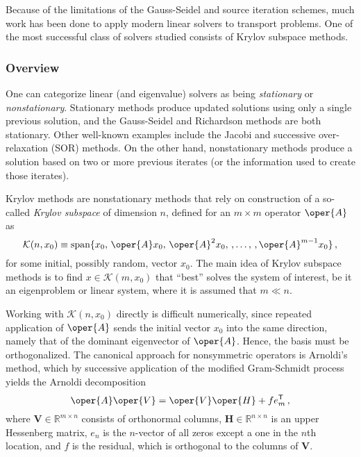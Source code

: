 Because of the limitations of the Gauss-Seidel and source iteration
schemes, much work has been done to apply modern linear solvers to
transport problems.  One of the most successful class of solvers 
studied consists of Krylov subspace methods.  

\subsubsection{Overview}

One can categorize linear (and eigenvalue) solvers as being 
\emph{stationary} or \emph{nonstationary}.  Stationary methods
produce updated solutions using only a single previous solution, and
the Gauss-Seidel and Richardson methods are both stationary.  Other 
well-known examples include the Jacobi and 
successive over-relaxation (SOR) methods.
On the other hand, nonstationary methods produce a solution based on 
two or more previous iterates (or the information used to create those 
iterates). 

Krylov methods are nonstationary methods that rely on 
construction of a so-called \emph{Krylov subspace} of dimension $n$, 
defined for an $m \times m$ operator $\oper{A}$ as
\begin{equation}
 \mathcal{K}(n,x_0) \equiv \text{span} 
     \{x_0,\, \oper{A}x_0,\, \oper{A}^2x_0,\, 
         ,\ldots,\,, \oper{A}^{m-1}x_0 \} \, , 
 \label{eq:krylovsubspace}
\end{equation}
for some initial, possibly random, vector $x_0$.  The main idea of Krylov
subspace methods is to find  $x \in \mathcal{K}(m,x_0)$  
 that ``best'' solves the system of interest, be it an 
eigenproblem or linear system, where it is assumed that $m \ll n$.

Working with $\mathcal{K}(n, x_0)$ directly is difficult numerically, since
repeated application of $\oper{A}$ sends the initial vector $x_0$ into the
same direction, namely that of the dominant eigenvector of $\oper{A}$.  
Hence, the basis 
must be orthogonalized. The canonical approach for nonsymmetric 
operators is Arnoldi's method, which by successive application of the 
modified Gram-Schmidt process yields the Arnoldi decomposition
\begin{equation}
 \oper{A}\oper{V} = \oper{V} \oper{H} + fe^{\transp}_m \, ,
\end{equation}
where $\mathbf{V} \in \mathbb{R}^{m\times n}$  consists of
orthonormal columns,
$\mathbf{H} \in \mathbb{R}^{n \times n} $ is an upper Hessenberg matrix, 
$e_n$ is the
$n$-vector of all zeros except a one in the $n$th location, and $f$ is 
the residual, which is orthogonal to the columns of $\mathbf{V}$.  

